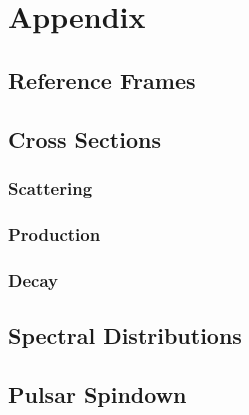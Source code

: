 \chapter*{Appendix}
\label{ch:appendix}

\section{Reference Frames}
\label{sec:frames}

\section{Cross Sections}
\label{sec:cross}

\subsection*{Scattering}

\autocite{Fagundes_2012}

\subsection*{Production}

\subsection*{Decay}

\section{Spectral Distributions}
\label{sec:spectral}

\section{Pulsar Spindown}
\label{sec:spindown}
